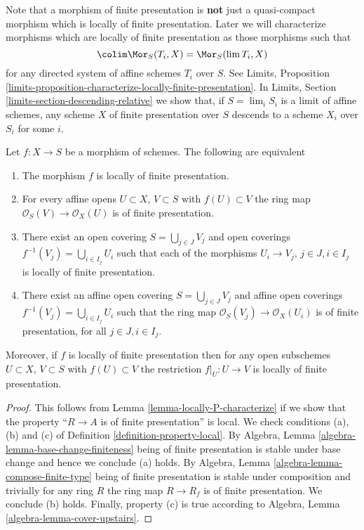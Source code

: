 \noindent
Note that a morphism of finite presentation is {\bf not} just a quasi-compact
morphism which is locally of finite presentation.
Later we will characterize morphisms which are
locally of finite presentation as those morphisms such that
$$
\colim \Mor_S(T_i, X) = \Mor_S(\lim T_i, X)
$$
for any directed system of affine schemes $T_i$ over $S$. See
Limits,
Proposition \ref{limits-proposition-characterize-locally-finite-presentation}.
In Limits, Section \ref{limits-section-descending-relative} we show
that, if $S = \lim_i S_i$ is a limit of affine schemes,
any scheme $X$ of finite presentation over $S$ descends to a scheme
$X_i$ over $S_i$ for some $i$.

\begin{lemma}
\label{lemma-locally-finite-presentation-characterize}
Let $f : X \to S$ be a morphism of schemes.
The following are equivalent
\begin{enumerate}
\item The morphism $f$ is locally of finite presentation.
\item For every affine opens $U \subset X$, $V \subset S$
with $f(U) \subset V$ the ring map
$\mathcal{O}_S(V) \to \mathcal{O}_X(U)$ is of finite presentation.
\item There exist an open covering $S = \bigcup_{j \in J} V_j$
and open coverings $f^{-1}(V_j) = \bigcup_{i \in I_j} U_i$ such
that each of the morphisms $U_i \to V_j$, $j\in J, i\in I_j$
is locally of finite presentation.
\item There exist an affine open covering $S = \bigcup_{j \in J} V_j$
and affine open coverings $f^{-1}(V_j) = \bigcup_{i \in I_j} U_i$ such
that the ring map $\mathcal{O}_S(V_j) \to \mathcal{O}_X(U_i)$ is
of finite presentation, for all $j\in J, i\in I_j$.
\end{enumerate}
Moreover, if $f$ is locally of finite presentation then for
any open subschemes $U \subset X$, $V \subset S$ with $f(U) \subset V$
the restriction $f|_U : U \to V$ is locally of finite presentation.
\end{lemma}

\begin{proof}
This follows from Lemma \ref{lemma-locally-P-characterize} if we show that
the property ``$R \to A$ is of finite presentation'' is local.
We check conditions (a), (b) and (c) of Definition
\ref{definition-property-local}.
By Algebra, Lemma \ref{algebra-lemma-base-change-finiteness}
being of finite presentation is stable under base change and hence
we conclude (a) holds. By Algebra, Lemma
\ref{algebra-lemma-compose-finite-type} being of finite presentation
is stable under composition and trivially for any ring
$R$ the ring map $R \to R_f$ is of finite presentation.
We conclude (b) holds. Finally, property (c) is true
according to Algebra, Lemma \ref{algebra-lemma-cover-upstairs}.
\end{proof}

